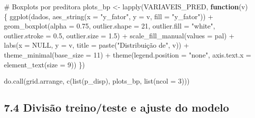 \documentclass[
  letterpaper,
  DIV=11,
  numbers=noendperiod]{scrartcl}
\newenvironment{Shaded}{\begin{snugshade}}{\end{snugshade}}
\newcommand{\AttributeTok}[1]{\textcolor[rgb]{0.40,0.45,0.13}{#1}}
\newcommand{\CommentTok}[1]{\textcolor[rgb]{0.37,0.37,0.37}{#1}}
\newcommand{\ConstantTok}[1]{\textcolor[rgb]{0.56,0.35,0.01}{#1}}
\newcommand{\ControlFlowTok}[1]{\textcolor[rgb]{0.00,0.23,0.31}{\textbf{#1}}}
\newcommand{\DecValTok}[1]{\textcolor[rgb]{0.68,0.00,0.00}{#1}}
\newcommand{\FloatTok}[1]{\textcolor[rgb]{0.68,0.00,0.00}{#1}}
\newcommand{\FunctionTok}[1]{\textcolor[rgb]{0.28,0.35,0.67}{#1}}
\newcommand{\NormalTok}[1]{\textcolor[rgb]{0.00,0.23,0.31}{#1}}
\newcommand{\OtherTok}[1]{\textcolor[rgb]{0.00,0.23,0.31}{#1}}
\newcommand{\SpecialCharTok}[1]{\textcolor[rgb]{0.37,0.37,0.37}{#1}}
\newcommand{\StringTok}[1]{\textcolor[rgb]{0.13,0.47,0.30}{#1}}
\newcounter{none} %
\begin{document}
\begin{Shaded}
\begin{Highlighting}[]
\CommentTok{\# Boxplots por preditora}
\NormalTok{plots\_bp }\OtherTok{\textless{}{-}} \FunctionTok{lapply}\NormalTok{(VARIAVEIS\_PRED, }\ControlFlowTok{function}\NormalTok{(v) \{}
  \FunctionTok{ggplot}\NormalTok{(dados, }\FunctionTok{aes\_string}\NormalTok{(}\AttributeTok{x =} \StringTok{"y\_fator"}\NormalTok{, }\AttributeTok{y =}\NormalTok{ v, }\AttributeTok{fill =} \StringTok{"y\_fator"}\NormalTok{)) }\SpecialCharTok{+}
    \FunctionTok{geom\_boxplot}\NormalTok{(}\AttributeTok{alpha =} \FloatTok{0.75}\NormalTok{, }\AttributeTok{outlier.shape =} \DecValTok{21}\NormalTok{,}
                 \AttributeTok{outlier.fill =} \StringTok{"white"}\NormalTok{, }\AttributeTok{outlier.stroke =} \FloatTok{0.5}\NormalTok{,}
                 \AttributeTok{outlier.size =} \FloatTok{1.5}\NormalTok{) }\SpecialCharTok{+}
    \FunctionTok{scale\_fill\_manual}\NormalTok{(}\AttributeTok{values =}\NormalTok{ pal) }\SpecialCharTok{+}
    \FunctionTok{labs}\NormalTok{(}\AttributeTok{x =} \ConstantTok{NULL}\NormalTok{, }\AttributeTok{y =}\NormalTok{ v,}
         \AttributeTok{title =} \FunctionTok{paste}\NormalTok{(}\StringTok{"Distribuição de"}\NormalTok{, v)) }\SpecialCharTok{+}
    \FunctionTok{theme\_minimal}\NormalTok{(}\AttributeTok{base\_size =} \DecValTok{11}\NormalTok{) }\SpecialCharTok{+}
    \FunctionTok{theme}\NormalTok{(}\AttributeTok{legend.position =} \StringTok{"none"}\NormalTok{,}
          \AttributeTok{axis.text.x =} \FunctionTok{element\_text}\NormalTok{(}\AttributeTok{size =} \DecValTok{9}\NormalTok{))}
\NormalTok{\})}

\FunctionTok{do.call}\NormalTok{(grid.arrange, }\FunctionTok{c}\NormalTok{(}\FunctionTok{list}\NormalTok{(p\_disp), plots\_bp, }\FunctionTok{list}\NormalTok{(}\AttributeTok{ncol =} \DecValTok{3}\NormalTok{)))}
\end{Highlighting}
\end{Shaded}

\subsection{7.4 Divisão treino/teste e ajuste do
modelo}\label{divisuxe3o-treinoteste-e-ajuste-do-modelo}
\end{document}

